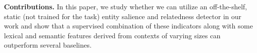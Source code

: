 \documentclass[sigconf,authordraft]{acmart}
\begin{document}
\textbf{Contributions.} In this paper, we study whether we can utilize an off-the-shelf, static (not trained for the task) entity salience and relatedness detector in our work and show that a supervised combination of these indicators along with some lexical and semantic features derived from contexts of varying sizes can outperform several baselines. 



\end{document}
